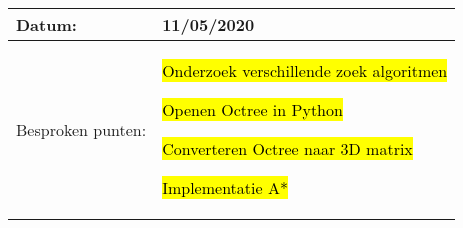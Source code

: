 \begin{tabularx}{\textwidth}{| l | X |}
  \hline
  Datum: & 11/05/2020\\
  \hline
  Besproken punten: &
  \begin{compactitem}
    \item \hl{Onderzoek verschillende zoek algoritmen}
    \item \hl{Openen Octree in Python}
    \item \hl{Converteren Octree naar 3D matrix}
    \item \hl{Implementatie A*}
  \end{compactitem}\\
  \hline
\end{tabularx}